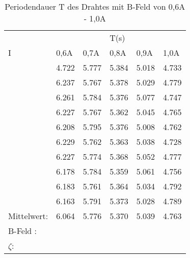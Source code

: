 \begin{table}
    \centering
    \label{tab:tabelle_1}
    \begin{tabular}{p{3cm} | p{1.5cm} p{1.5cm} p{1.5cm} p{1.5cm} p{1.5cm}}
      &      &      & T(s) &      &     \\
    I & 0,6A & 0,7A & 0,8A & 0,9A & 1,0A\\
    \midrule
    & 4.722 &  5.777 &  5.384 &  5.018 &  4.733\\
    & 6.237 &  5.767 &  5.378 &  5.029 &  4.779\\
    & 6.261 &  5.784 &  5.376 &  5.077 &  4.747\\
    & 6.227 &  5.767 &  5.362 &  5.045 &  4.765\\
    & 6.208 &  5.795 &  5.376 &  5.008 &  4.762\\
    & 6.229 &  5.762 &  5.363 &  5.038 &  4.728\\
    & 6.227 &  5.774 &  5.368 &  5.052 &  4.777\\
    & 6.178 &  5.784 &  5.359 &  5.061 &  4.756\\
    & 6.183 &  5.761 &  5.364 &  5.034 &  4.792\\
    & 6.163 &  5.791 &  5.373 &  5.028 &  4.789\\
    \midrule
    Mittelwert:    & 6.064 & 5.776 & 5.370 & 5.039 &  4.763 \\
    \midrule
    B-Feld : & & & & & \\
    $\zeta$: & & & & & \\
    \bottomrule
    \end{tabular}
    \caption{Periodendauer T des Drahtes mit B-Feld von 0,6A - 1,0A}
    \label{tab:tabelle_06A}
\end{table}

\label{sec:Auswertung}
